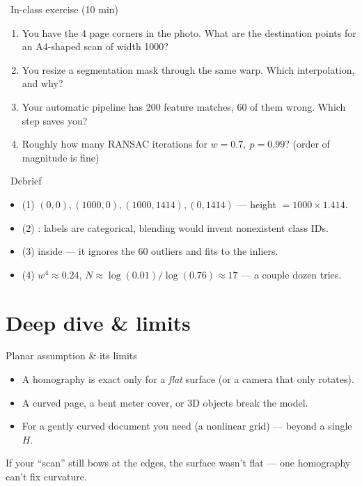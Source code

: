 \documentclass[10pt,aspectratio=169]{beamer}
\begin{document}
\begin{frame}{\faPen~In-class exercise (10 min)}
  \begin{infobox}
  \end{infobox}
  \begin{enumerate}
    \item You have the 4 page corners in the photo. What are the destination points for an
          A4-shaped scan of width 1000?
    \item You resize a segmentation mask through the same warp. Which interpolation, and why?
    \item Your automatic pipeline has 200 feature matches, 60 of them wrong. Which step saves you?
    \item Roughly how many RANSAC iterations for $w=0.7,\ p=0.99$? (order of magnitude is fine)
  \end{enumerate}
\end{frame}

\begin{frame}{\faPen~Debrief}
  \begin{itemize}
    \item (1) $(0,0),(1000,0),(1000,1414),(0,1414)$ — height $=1000\times1.414$.
    \item (2) : labels are categorical, blending would invent nonexistent class IDs.
    \item (3)  inside  — it ignores the 60 outliers and fits to the inliers.
    \item (4) $w^4\approx0.24$, $N\approx\log(0.01)/\log(0.76)\approx 17$ — a couple dozen tries.
  \end{itemize}
\end{frame}

\section{Deep dive \& limits}

\begin{frame}{Planar assumption \& its limits}
  \begin{itemize}
    \item A homography is exact only for a \emph{flat} surface (or a camera that only rotates).
    \item A curved page, a bent meter cover, or 3D objects break the model.
    \item For a gently curved document you need  (a nonlinear grid) — beyond a single $H$.
  \end{itemize}
  \begin{badbox}
    If your ``scan'' still bows at the edges, the surface wasn't flat — one homography can't fix curvature.
  \end{badbox}
\end{frame}
\end{document}
